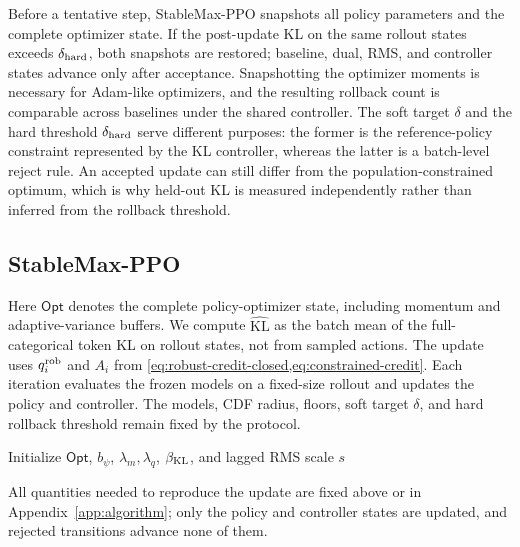 \documentclass{article}
\newcommand{\method}{StableMax-PPO}
\theoremstyle{definition}
\theoremstyle{remark}
\begin{document}
Before a tentative step, \method{} snapshots all policy parameters and the
complete optimizer state.  If the post-update KL on the same rollout states
exceeds \(\delta_{\rm hard}\), both snapshots are restored; baseline, dual,
RMS, and controller states advance only after acceptance.  Snapshotting the
optimizer moments is necessary for Adam-like optimizers, and the resulting
rollback count is comparable across baselines under the shared controller.
The soft target \(\delta\) and the hard threshold \(\delta_{\rm hard}\) serve
different purposes: the former is the reference-policy constraint represented
by the KL controller, whereas the latter is a batch-level reject rule.  An
accepted update can still differ from the population-constrained optimum, which
is why held-out KL is measured independently rather than inferred from the
rollback threshold.

\subsection{StableMax-PPO}
\label{subsec:algorithm}
Here \(\mathsf{Opt}\) denotes the complete policy-optimizer state, including
momentum and adaptive-variance buffers.  We compute
\(\widehat{\mathrm{KL}}\) as the batch mean of the full-categorical token KL on
rollout states, not from sampled actions.  The update uses \(q_i^{\rm rob}\) and
\(A_i\) from \cref{eq:robust-credit-closed,eq:constrained-credit}.  Each iteration
evaluates the frozen models on a fixed-size rollout and updates the policy and
controller. The models, CDF radius, floors, soft target \(\delta\), and hard
rollback threshold remain fixed by the protocol.
\begin{algorithm}[H]
\caption{StableMax-PPO update}
\label{alg:stablemax}
Initialize \(\mathsf{Opt}\), \(b_\psi\), \(\lambda_m,\lambda_q\),
\(\beta_{\rm KL}\), and lagged RMS scale \(s\)\;
\end{algorithm}
All quantities needed to reproduce the update are fixed above or in
Appendix~\ref{app:algorithm}; only the policy and controller states are
updated, and rejected transitions advance none of them.
\end{document}
